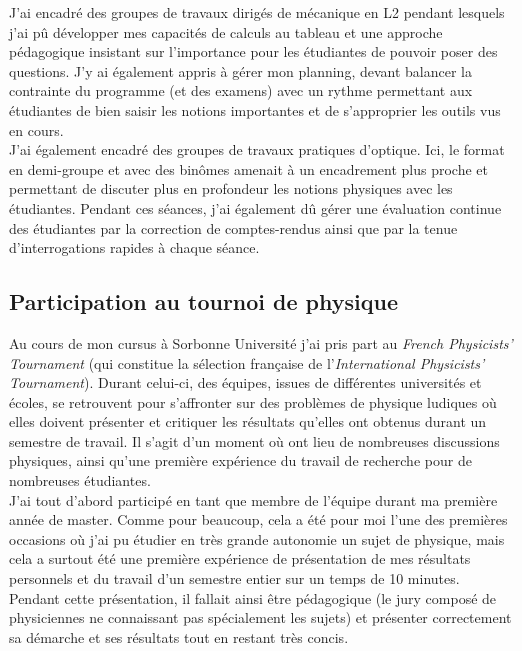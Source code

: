 \documentclass[a4paper,11pt]{article} %
\newcommand{\pointmedian}{\fontfamily{cmr}\selectfont\textperiodcentered}
\begin{document}
	J'ai encadré des groupes de travaux dirigés de mécanique en L2 pendant lesquels j'ai pû développer mes capacités de calculs au tableau et une approche pédagogique insistant sur l'importance pour les étudiant\pointmedian es de pouvoir poser des questions. J'y ai également appris à gérer mon planning, devant balancer la contrainte du programme (et des examens) avec un rythme permettant aux étudiant\pointmedian es de bien saisir les notions importantes et de s'approprier les outils vus en cours.\\
	
	J'ai également encadré des groupes de travaux pratiques d'optique. Ici, le format en demi-groupe et avec des binômes amenait à un encadrement plus proche et permettant de discuter plus en profondeur les notions physiques avec les étudiant\pointmedian es. Pendant ces séances, j'ai également dû gérer une évaluation continue des étudiant\pointmedian es par la correction de comptes-rendus ainsi que par la tenue d'interrogations rapides à chaque séance.\\
	
	\subsection{Participation au tournoi de physique}
	Au cours de mon cursus à Sorbonne Université j'ai pris part au \textit{French Physicists' Tournament} (qui constitue la sélection française de l'\textit{International Physicists' Tournament}). Durant celui-ci, des équipes, issues de différentes universités et écoles, se retrouvent pour \textgravedbl s'affronter\textacutedbl{} sur des problèmes de physique ludiques où elles doivent présenter et critiquer les résultats qu'elles ont obtenus durant un semestre de travail. Il s'agit d'un moment où ont lieu de nombreuses discussions physiques, ainsi qu'une première expérience du travail de recherche pour de nombreu\pointmedian ses étudiant\pointmedian es.\\
	
	J'ai tout d'abord participé en tant que membre de l'équipe durant ma première année de master. Comme pour beaucoup, cela a été pour moi l'une des premières occasions où j'ai pu étudier en très grande autonomie un sujet de physique, mais cela a surtout été une première expérience de présentation de mes résultats personnels et du travail d'un semestre entier sur un temps de 10 minutes. Pendant cette présentation, il fallait ainsi être pédagogique (le jury composé de physicien\pointmedian nes ne connaissant pas spécialement les sujets) et présenter correctement sa démarche et ses résultats tout en restant très concis.\\
	
\end{document}

